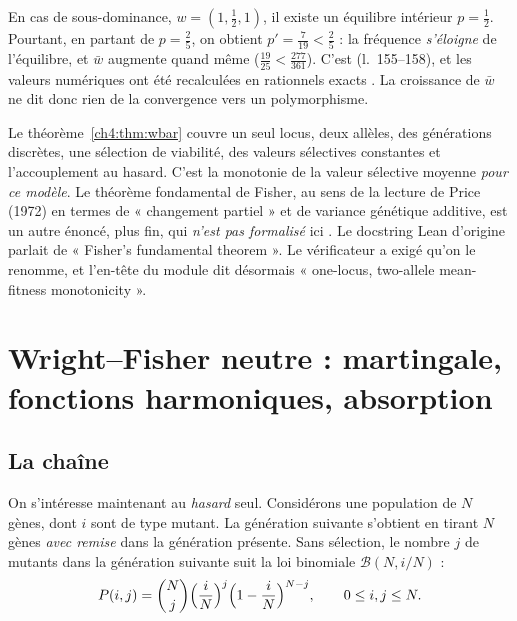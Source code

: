 \begin{remark}
En cas de sous-dominance, $w=(1,\frac12,1)$, il existe un équilibre intérieur $p=\frac12$. Pourtant, en partant de
$p=\frac25$, on obtient $p'=\frac7{19}<\frac25$ : la fréquence \emph{s'éloigne} de l'équilibre, et $\bar w$
augmente quand même ($\frac{19}{25}<\frac{277}{361}$). C'est  (l.~155--158),
et les valeurs numériques ont été recalculées en rationnels exacts \tierX. La croissance de $\bar w$ ne dit donc
rien de la convergence vers un polymorphisme.
\end{remark}

\begin{warnbox}
Le théorème~\ref{ch4:thm:wbar} couvre un seul locus, deux allèles, des générations discrètes, une sélection de
viabilité, des valeurs sélectives constantes et l'accouplement au hasard. C'est la monotonie de la valeur
sélective moyenne \emph{pour ce modèle}. Le théorème fondamental de Fisher, au sens de la lecture de Price (1972)
en termes de « changement partiel » \cite{ch4:Pri72} et de variance génétique additive, est un autre énoncé, plus fin, qui
\emph{n'est pas formalisé} ici \tierC. Le docstring Lean d'origine parlait de « Fisher's fundamental theorem ». Le
vérificateur a exigé qu'on le renomme, et l'en-tête du module dit désormais « one-locus, two-allele mean-fitness
monotonicity ».
\end{warnbox}

\section[Wright--Fisher neutre]{Wright--Fisher neutre : martingale, fonctions harmoniques, absorption}\label{ch4:sec:wf}

\subsection{La chaîne}
On s'intéresse maintenant au \emph{hasard} seul. Considérons une population de $N$ gènes, dont $i$ sont de type
mutant. La génération suivante s'obtient en tirant $N$ gènes \emph{avec remise} dans la génération présente.
Sans sélection, le nombre $j$ de mutants dans la génération suivante suit la loi binomiale
$\mathcal B(N,i/N)$ :
\[
P(i,j)=\binom Nj\Bigl(\frac iN\Bigr)^j\Bigl(1-\frac iN\Bigr)^{N-j},\qquad 0\le i,j\le N .
\]

